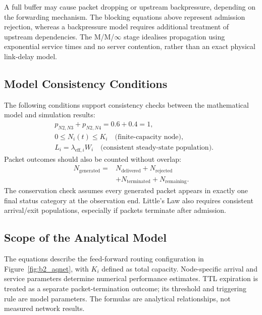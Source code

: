 A full buffer may cause packet dropping or upstream backpressure,
depending on the forwarding mechanism. The blocking equations above
represent admission rejection, whereas a backpressure model requires
additional treatment of upstream dependencies. The M/M/$\infty$ stage
idealises propagation using exponential service times and no
server contention, rather than an exact physical link-delay model.

\subsection{Model Consistency Conditions}
The following conditions support consistency checks between the
mathematical model and simulation results:
\begin{align}
&p_{N2,N3}+p_{N2,N4}=0.6+0.4=1,
\label{eq:b2_routing_sum}\\
&0\leq N_i(t)\leq K_i\quad\text{(finite-capacity node)},
\label{eq:b2_capacity}\\
&L_i=\lambda_{\mathrm{eff},i}W_i
\quad\text{(consistent steady-state population)}.
\label{eq:b2_little}
\end{align}
Packet outcomes should also be counted without overlap:
\begin{equation}
\begin{split}
N_{\mathrm{generated}}={}&N_{\mathrm{delivered}}+
N_{\mathrm{rejected}}\\
&+N_{\mathrm{terminated}}+N_{\mathrm{remaining}}.
\end{split}
\label{eq:b2_balance}
\end{equation}
The conservation check assumes every generated packet appears in
exactly one final status category at the observation end. Little's
Law also requires consistent arrival/exit populations, especially if
packets terminate after admission.

\subsection{Scope of the Analytical Model}
The equations describe the feed-forward routing configuration in
Figure~\ref{fig:b2_aqnet}, with $K_i$ defined as total capacity.
Node-specific arrival and service parameters determine numerical
performance estimates. TTL expiration is treated as a separate
packet-termination outcome; its threshold and triggering rule are
model parameters. The formulas are analytical relationships, not
measured network results.
